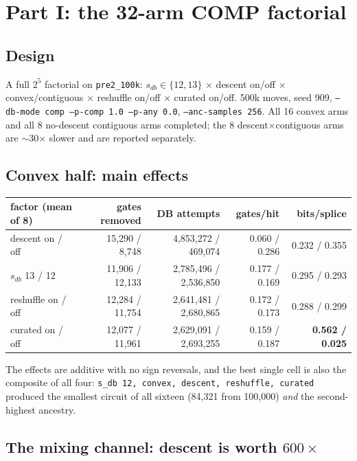 \documentclass[11pt]{article}
\newcommand{\code}[1]{\texttt{#1}}
\begin{document}
\section{Part I: the 32-arm COMP factorial}

\subsection{Design}

A full $2^5$ factorial on \code{pre2\_100k}: $s_{db}\in\{12,13\}$ $\times$
descent on/off $\times$ convex/contiguous $\times$ reshuffle on/off $\times$
curated on/off. 500k moves, seed 909, \code{--db-mode comp --p-comp 1.0
--p-any 0.0}, \code{--anc-samples 256}. All 16 convex arms and all 8
no-descent contiguous arms completed; the 8 descent$\times$contiguous arms are
$\sim$30$\times$ slower and are reported separately.

\subsection{Convex half: main effects}

\begin{table}[h]\centering\small
\begin{tabular}{lrrrr}
\toprule
factor (mean of 8) & gates removed & DB attempts & gates/hit & bits/splice \\
\midrule
descent on / off & 15{,}290 / 8{,}748 & 4{,}853{,}272 / 469{,}074 & 0.060 / 0.286 & 0.232 / 0.355 \\
$s_{db}$ 13 / 12 & 11{,}906 / 12{,}133 & 2{,}785{,}496 / 2{,}536{,}850 & 0.177 / 0.169 & 0.295 / 0.293 \\
reshuffle on / off & 12{,}284 / 11{,}754 & 2{,}641{,}481 / 2{,}680{,}865 & 0.172 / 0.173 & 0.288 / 0.299 \\
curated on / off & 12{,}077 / 11{,}961 & 2{,}629{,}091 / 2{,}693{,}255 & 0.159 / 0.187 & \textbf{0.562 / 0.025} \\
\bottomrule
\end{tabular}
\end{table}

The effects are additive with no sign reversals, and the best single cell is
also the composite of all four: \code{s\_db 12, convex, descent, reshuffle,
curated} produced the smallest circuit of all sixteen (84{,}321 from 100{,}000)
\emph{and} the second-highest ancestry.

\subsection{The mixing channel: descent is worth $600\times$}
\end{document}
